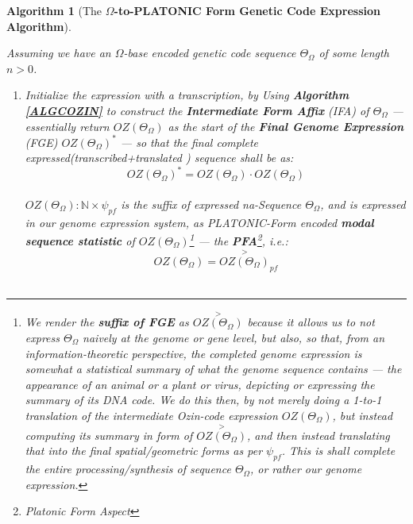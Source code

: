 \documentclass[a4paper, 18pt]{book} %
\newtheorem{alg}{Algorithm}
\begin{document}
\begin{alg}[The \textbf{$\Omega$-to-PLATONIC Form Genetic Code Expression Algorithm}]
\label{ALGCOZINPLATO}

Assuming we have an $\Omega$-base encoded genetic code sequence $\Theta_\Omega$ of some length $n > 0$.

\begin{enumerate}
\item{Initialize the expression with a transcription, by Using \textbf{Algorithm \ref{ALGCOZIN}} to construct the \textbf{Intermediate Form Affix} (IFA) of $\Theta_\Omega$ --- essentially return $OZ(\Theta_\Omega)$ as the start of the \textbf{Final Genome Expression} (FGE) $\boxed{OZ(\Theta_\Omega)}^*$ --- so that the final complete expressed(transcribed+translated ) sequence shall be as:\\

\begin{equation}
\label{EQTRANSLGENSEQ}
\boxed{OZ(\Theta_\Omega)}^* = OZ(\Theta_\Omega)\cdot\boxed{OZ(\Theta_\Omega)}
\end{equation}\\

$\boxed{OZ(\Theta_\Omega)}: \mathbb{N} \times \psi_{pf}$ is the suffix of expressed na-Sequence $\Theta_\Omega$, and is expressed in our genome expression system, as PLATONIC-Form encoded \textbf{modal sequence statistic} of $OZ(\Theta_\Omega)$\footnote{We render the \textbf{suffix of FGE} as $\overset{>}{OZ(\Theta_\Omega)}$ because it allows us to not express $\Theta_\Omega$ naively at the genome or gene level, but also, so that, from an information-theoretic perspective, the completed genome expression is somewhat a statistical summary of what the genome sequence contains --- the appearance of an animal or a plant or virus, depicting or expressing the summary of its DNA code. We do this then, by not merely doing a 1-to-1 translation of the intermediate Ozin-code expression $OZ(\Theta_\Omega)$, but instead computing its summary in form of $\overset{>}{OZ(\Theta_\Omega)}$, and then instead translating that into the final spatial/geometric forms as per $\psi_{pf}$. This is shall complete the entire processing/synthesis of sequence $\Theta_\Omega$, or rather our genome expression.} --- the \textbf{PFA}\footnote{Platonic Form Aspect}, i.e.:\\

\begin{equation}
 \boxed{OZ(\Theta_\Omega)} = \boxed{\overset{>}{OZ(\Theta_\Omega)}}_{pf}
\end{equation}\\


}
\end{enumerate}
\end{alg}
\end{document}

